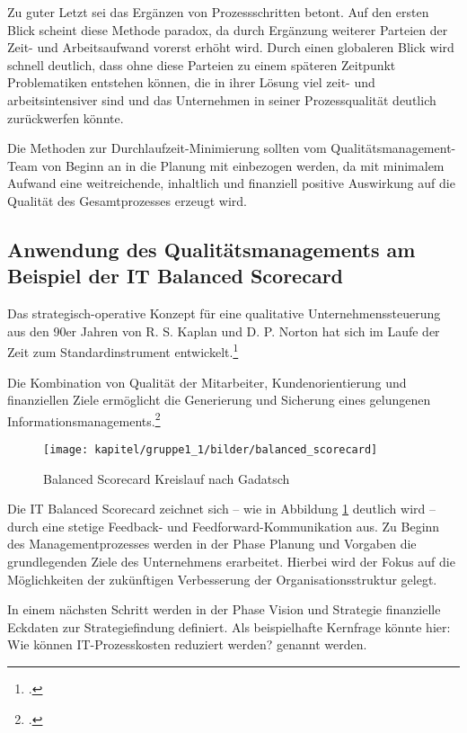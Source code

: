 Zu guter Letzt sei das Ergänzen von Prozessschritten betont. Auf den ersten Blick scheint diese Methode paradox, da durch Ergänzung weiterer Parteien der Zeit- und Arbeitsaufwand vorerst erhöht wird. Durch einen globaleren Blick wird schnell deutlich, dass ohne diese Parteien zu einem späteren Zeitpunkt Problematiken entstehen können, die in ihrer Lösung viel zeit- und arbeitsintensiver sind und das Unternehmen in seiner Prozessqualität deutlich zurückwerfen könnte.

Die Methoden zur Durchlaufzeit-Minimierung sollten vom Qualitätsmanagement-Team von Beginn an in die Planung mit einbezogen werden, da mit minimalem Aufwand eine weitreichende, inhaltlich und finanziell positive Auswirkung auf die Qualität des Gesamtprozesses erzeugt wird. 

\subsection{Anwendung des Qualitätsmanagements am Beispiel der IT Balanced Scorecard}
\label{subsection_anwendung_it_balanced_scorecard}
Das strategisch-operative Konzept für eine qualitative Unternehmenssteuerung aus den 90er Jahren 
von R. S. Kaplan und D. P. Norton hat sich im Laufe der Zeit zum Standardinstrument 
entwickelt.\footcite{friedag_scorecard_2004}

Die Kombination von Qualität der Mitarbeiter, Kundenorientierung und finanziellen Ziele ermöglicht die 
Generierung und Sicherung eines gelungenen Informationsmanagements.\footcite{gabriel_inm_2003}

\begin{figure}[h!]
	\centering
	\texttt{[image: kapitel/gruppe1\_1/bilder/balanced\_scorecard]}
	\caption{Balanced Scorecard Kreislauf nach Gadatsch\protect\footnotemark}
	\label{fig_balanced_scorecard_cycle}
\end{figure}
\newpage

Die IT Balanced Scorecard zeichnet sich – wie in Abbildung \ref{fig_balanced_scorecard_cycle} deutlich wird – durch eine stetige Feedback- und Feedforward-Kommunikation aus. 
Zu Beginn des Managementprozesses werden in der Phase \glqq Planung und Vorgaben\grqq{} die 
grundlegenden Ziele des Unternehmens erarbeitet. Hierbei wird der Fokus auf die Möglichkeiten der 
zukünftigen Verbesserung der Organisationsstruktur gelegt.

In einem nächsten Schritt werden in der Phase \glqq Vision und Strategie\grqq{} finanzielle Eckdaten zur 
Strategiefindung definiert. Als beispielhafte Kernfrage könnte hier: \glqq Wie können IT-Prozesskosten reduziert werden?\grqq{} genannt werden.

